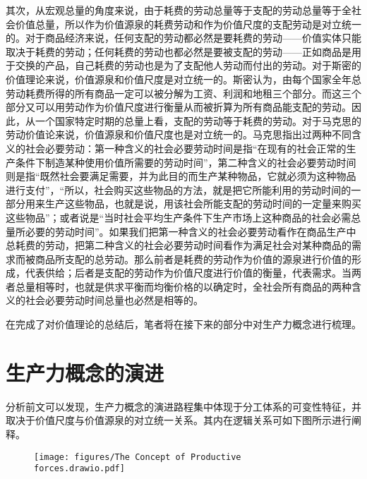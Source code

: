 其次，从宏观总量的角度来说，由于耗费的劳动总量等于支配的劳动总量等于全社会价值总量\cite[71-72]{CaiJiMingLunHaoFeiDeLaoDongYuGouMaiDeLaoDongZaiJieZhiLiLunZhongDeZuoYong2022}，所以作为价值源泉的耗费劳动和作为价值尺度的支配劳动是对立统一的。对于商品经济来说，任何支配的劳动都必然是要耗费的劳动——价值实体只能取决于耗费的劳动；任何耗费的劳动也都必然是要被支配的劳动——正如商品是用于交换的产品，自己耗费的劳动也是为了支配他人劳动而付出的劳动。对于斯密的价值理论来说，价值源泉和价值尺度是对立统一的。斯密认为，由每个国家全年总劳动耗费所得的所有商品一定可以被分解为工资、利润和地租三个部分。而这三个部分又可以用劳动作为价值尺度进行衡量从而被折算为所有商品能支配的劳动。因此，从一个国家特定时期的总量上看，支配的劳动等于耗费的劳动。\cite[41-48]{YaDang*SiMiGuoFuLun2015}对于马克思的劳动价值论来说，价值源泉和价值尺度也是对立统一的。马克思指出过两种不同含义的社会必要劳动\cite[29]{CaiJiMingBiYaoLaoDongIHeBiYaoLaoDongIIGongTongJueDingJieZhi1995}\cite[19]{GuShuTangDuiJieZhiJueDingHeJieZhiGuiLuDeZaiTanTao1982}：第一种含义的社会必要劳动时间是指“在现有的社会正常的生产条件下制造某种使用价值所需要的劳动时间”\cite[52]{ZhongGongZhongYangMaKeSiEnGeSiLieNingSiDaLinZhuZuoBianYiJuMaKeSiEnGeSiWenJiDi5Juan2009}，第二种含义的社会必要劳动时间则是指“既然社会要满足需要，并为此目的而生产某种物品，它就必须为这种物品进行支付”，“所以，社会购买这些物品的方法，就是把它所能利用的劳动时间的一部分用来生产这些物品，也就是说，用该社会所能支配的劳动时间的一定量来购买这些物品”\cite[208]{ZhongGongZhongYangMaKeSiEnGeSiLieNingSiDaLinZhuZuoBianYiJuMaKeSiEnGeSiWenJiDi7Juan2009}；或者说是“当时社会平均生产条件下生产市场上这种商品的社会必需总量所必要的劳动时间”\cite[722]{ZhongGongZhongYangMaKeSiEnGeSiLieNingSiDaLinZhuZuoBianYiJuMaKeSiEnGeSiWenJiDi7Juan2009}。如果我们把第一种含义的社会必要劳动看作在商品生产中总耗费的劳动，把第二种含义的社会必要劳动时间看作为满足社会对某种商品的需求而被商品所支配的总劳动。那么前者是耗费的劳动作为价值的源泉进行价值的形成，代表供给；后者是支配的劳动作为价值尺度进行价值的衡量，代表需求。当两者总量相等时，也就是供求平衡而均衡价格的以确定时，全社会所有商品的两种含义的社会必要劳动时间总量也必然是相等的。\cite[72]{CaiJiMingLunHaoFeiDeLaoDongYuGouMaiDeLaoDongZaiJieZhiLiLunZhongDeZuoYong2022}

在完成了对价值理论的总结后，笔者将在接下来的部分中对生产力概念进行梳理。

\section{生产力概念的演进}

分析前文可以发现，生产力概念的演进路程集中体现于分工体系的可变性特征，并取决于价值尺度与价值源泉的对立统一关系。其内在逻辑关系可如下图所示进行阐释。

\begin{figure}
    \texttt{[image: figures/The Concept of Productive forces.drawio.pdf]}
\end{figure}
